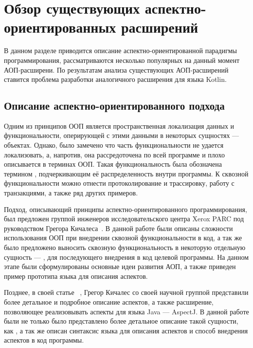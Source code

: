 \chapter{Обзор существующих аспектно-ориентированных расширений}
\label{ch:aop_overview}
В данном разделе приводится описание аспектно-ориентированной парадигмы
программирования, рассматриваются несколько популярных на данный момент
АОП-расширени.
По результатам анализа существующих АОП-расширений ставится проблема разработки
аналогичного расширения для языка Kotlin.
\section{Описание аспектно-ориентированного подхода}
\label{sec:aop_description}
Одним из принципов ООП является пространственная локализация данных и функциональности, оперирующей с этими данными в некоторых сущностях --- объектах.
Однако, было замечено что часть функциональности не удается локализовать, а, напротив, она рассредоточена по всей программе и плохо описывается в терминах ООП.
Такая функциональность была обозначена термином , подчеркивающим её распределенность внутри программы.
К сквозной функциональности можно отнести протоколирование и трассировку, работу с транзакциями, а также ряд других примеров.

Подход, описывающий принципы аспектно-ориентированного программирования, был
предложен группой инженеров исследовательского центра Xerox PARC под
руководством Грегора Кичалеса~\cite{kiczales_aop}.
В данной работе были описаны сложности использования ООП при внедрении сквозной
функциональности в код, а так же было предложено выносить сквозную
функциональность в некоторую отдельную сущность --- , для
последующего внедрения в код целевой программы.
На данном этапе были сформулированы основные идеи развития АОП, а также приведен
пример прототипа языка для описания аспектов.

Позднее, в своей статье ~\cite{kiczales_aspectj},
Грегор Кичалес со своей научной группой представили более детальное и подробное
описание аспектов, а также расширение, позволяющее реализовывать аспекты для
языка Java --- AspectJ.
В данной работе были не только было представлено более детальное описание такой
сущности, как , а так же описан синтаксис языка для описания
аспектов и способ внедрения аспектов в код программы.

